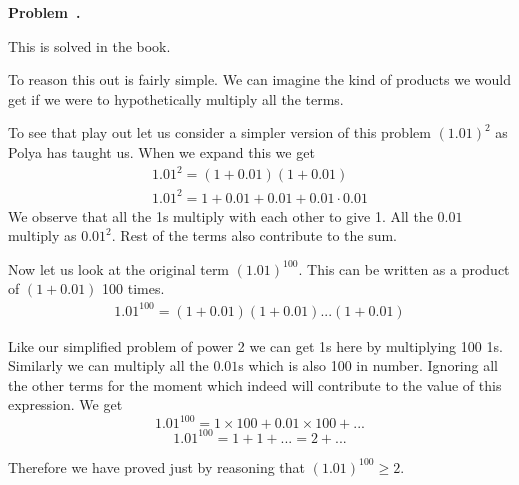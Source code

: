 \documentclass[10pt]{article}
\newcounter{problem}
\newenvironment{problem}[1][]{
  \refstepcounter{problem}
  \par\noindent\textbf{Problem~\theproblem. #1}\par
  \vspace{0.5em}
}{\vspace{1em}}
\begin{document}
\begin{problem} %
This is solved in the book. 

To reason this out is fairly simple. We can imagine the kind of products we would get if we were to hypothetically multiply all the terms. 

To see that play out let us consider a simpler version of this problem $(1.01)^2$ as Polya has taught us. When we expand this we get 
\begin{gather*}
  1.01^2 = (1 + 0.01) (1 + 0.01)\\
  1.01^2 = 1 + 0.01 + 0.01 + 0.01 \cdot 0.01
\end{gather*}
We observe that all the 1s multiply with each other to give 1. All the $0.01$ multiply as $0.01^2$. Rest of the terms also contribute to the sum.

Now let us look at the original term $(1.01)^{100}$. This can be written as a product of $(1 + 0.01)$ 100 times.
\begin{gather*}
1.01^{100} = (1 + 0.01)(1 + 0.01)...(1 + 0.01)
\end{gather*}

Like our simplified problem of power 2 we can get 1s here by multiplying 100 1s. Similarly we can multiply all the $0.01$s which is also 100 in number. Ignoring all 
the other terms for the moment which indeed will contribute to the value of this expression. We get 
\[
1.01^{100} = 1 \times 100 + 0.01 \times 100 + ...
\]
\[
1.01^{100} = 1 + 1 + ... = 2 + ...
\]

Therefore we have proved just by reasoning that $(1.01)^{100} \ge 2$. 
\end{problem}
\end{document}
